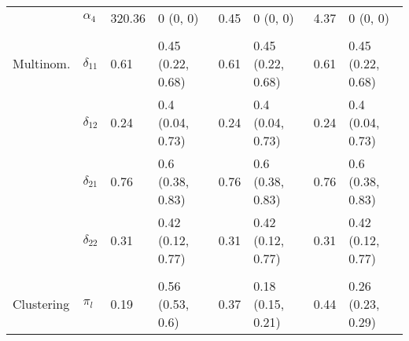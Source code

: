 \documentclass[]{article}
\begin{document}
\begin{table}[t]
\begin{tabular}{llllllll}
\hspace{1em} & $\alpha_{4}$ & 320.36 & 0 (0, 0) & 0.45 & 0 (0, 0) & 4.37 & 0 (0, 0)\\
\addlinespace[0.3em]
\multicolumn{8}{l}{\textbf{ }}\\
\hspace{1em}Multinom. & $\delta_{11}$ & 0.61 & 0.45 (0.22, 0.68) & 0.61 & 0.45 (0.22, 0.68) & 0.61 & 0.45 (0.22, 0.68)\\
\hspace{1em} & $\delta_{12}$ & 0.24 & 0.4 (0.04, 0.73) & 0.24 & 0.4 (0.04, 0.73) & 0.24 & 0.4 (0.04, 0.73)\\
\hspace{1em} & $\delta_{21}$ & 0.76 & 0.6 (0.38, 0.83) & 0.76 & 0.6 (0.38, 0.83) & 0.76 & 0.6 (0.38, 0.83)\\
\hspace{1em} & $\delta_{22}$ & 0.31 & 0.42 (0.12, 0.77) & 0.31 & 0.42 (0.12, 0.77) & 0.31 & 0.42 (0.12, 0.77)\\
\addlinespace[0.3em]
\multicolumn{8}{l}{\textbf{ }}\\
\hspace{1em}Clustering & $\pi_l$ & 0.19 & 0.56 (0.53, 0.6) & 0.37 & 0.18 (0.15, 0.21) & 0.44 & 0.26 (0.23, 0.29)\\
\bottomrule
\end{tabular}
\end{table}
\end{document}
